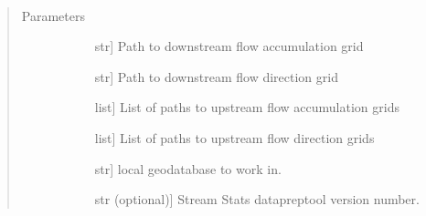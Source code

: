 \documentclass[letterpaper,10pt,english]{sphinxmanual}
\begin{document}
\begin{fulllineitems}
\label{\detokenize{make_hydrodem:make_hydrodem.adjust_accum}}~\begin{quote}\begin{description}
\item[{Parameters}] \leavevmode\begin{description}
\item[{}] \leavevmode{[}str{]}
Path to downstream flow accumulation grid

\item[{}] \leavevmode{[}str{]}
Path to downstream flow direction grid

\item[{}] \leavevmode{[}list{]}
List of paths to upstream flow accumulation grids

\item[{}] \leavevmode{[}list{]}
List of paths to upstream flow direction grids

\item[{}] \leavevmode{[}str{]}
local geodatabase to work in.

\item[{}] \leavevmode{[}str (optional){]}
Stream Stats datapreptool version number.

\end{description}

\end{description}\end{quote}

\end{fulllineitems}

\end{document}
